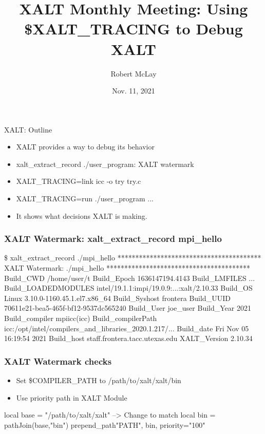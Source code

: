 \documentclass{beamer}
\begin{document}
\title[XALT]{XALT Monthly Meeting: Using \$XALT\_TRACING to Debug XALT}
\author{Robert McLay} 
\date{Nov. 11, 2021} 

\frame{\titlepage} 

\begin{frame}{XALT: Outline}
  \begin{itemize}
    \item XALT provides a way to debug its behavior
    \item xalt\_extract\_record ./user\_program: XALT watermark
    \item XALT\_TRACING=link  icc -o try try.c
    \item XALT\_TRACING=run ./user\_program ...
    \item It shows what decisions XALT is making.
  \end{itemize}
\end{frame}

\begin{frame}[fragile]
    \frametitle{XALT Watermark: xalt\_extract\_record mpi\_hello}
 {\tiny
    \begin{semiverbatim}
\$ xalt_extract_record ./mpi_hello 
****************************************
XALT Watermark: ./mpi_hello
****************************************
Build_CWD                /home/user/t
Build_Epoch              1636147194.4143
Build_LMFILES            ...
Build_LOADEDMODULES      intel/19.1.1:impi/19.0.9:...:xalt/2.10.33
Build_OS                 Linux 3.10.0-1160.45.1.el7.x86_64
Build_Syshost            frontera
Build_UUID               70611e21-bea5-465f-bf12-9537dc565240
Build_User               joe_user
Build_Year               2021
Build_compiler           mpiicc(icc)
Build_compilerPath       icc:/opt/intel/compilers_and_libraries_2020.1.217/...
Build_date               Fri Nov 05 16:19:54 2021
Build_host               staff.frontera.tacc.utexas.edu
XALT_Version             2.10.34
    \end{semiverbatim}
}
\end{frame}

\begin{frame}[fragile]
    \frametitle{XALT Watermark checks} 
  \begin{itemize}
    \item Set \$COMPILER\_PATH to /path/to/xalt/xalt/bin
    \item Use priority path in XALT Module
  \end{itemize}
 {\small
    \begin{semiverbatim}
local base  = "/path/to/xalt/xalt"  --> Change to match 
local bin   = pathJoin(base,"bin")
prepend_path{"PATH",  bin, priority="100"}
    \end{semiverbatim}
}
\end{frame}
\end{document}
